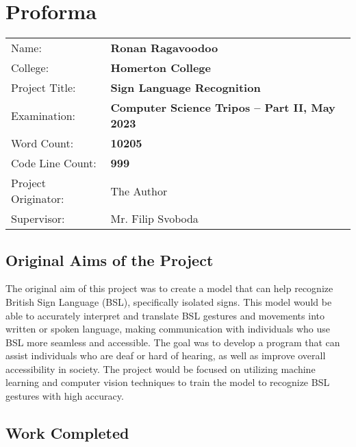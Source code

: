 \documentclass[final,rdr32.tex]{subfiles}
\begin{document}
\pagestyle{plain}

\chapter*{Proforma}

 {\large
  \begin{tabular}{ll}
      Name:               & \bf Ronan Ragavoodoo                             \\
      College:            & \bf Homerton College                             \\
      Project Title:      & \bf Sign Language Recognition                    \\
      Examination:        & \bf Computer Science Tripos -- Part II, May 2023 \\
      Word Count:         & \bf 10205\footnotemark                           \\
      Code Line Count:    & \bf 999\footnotemark                             \\
      Project Originator: & The Author                                       \\
      Supervisor:         & Mr. Filip Svoboda                                \\
  \end{tabular}
 }


\section*{Original Aims of the Project}


The original aim of this project was to create a model that can help recognize British Sign Language (BSL), specifically isolated signs. This model would be able to accurately interpret and translate BSL gestures and movements into written or spoken language, making communication with individuals who use BSL more seamless and accessible. The goal was to develop a program that can assist individuals who are deaf or hard of hearing, as well as improve overall accessibility in society. The project would be focused on utilizing machine learning and computer vision techniques to train the model to recognize BSL gestures with high accuracy.

\section*{Work Completed}
\end{document}
